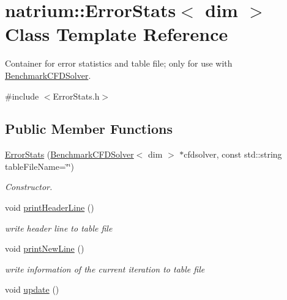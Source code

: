 \hypertarget{classnatrium_1_1ErrorStats}{
\section{natrium::ErrorStats$<$ dim $>$ Class Template Reference}
\label{classnatrium_1_1ErrorStats}
}


Container for error statistics and table file; only for use with \hyperlink{classnatrium_1_1BenchmarkCFDSolver}{BenchmarkCFDSolver}.  


{\ttfamily \#include $<$ErrorStats.h$>$}\subsection*{Public Member Functions}
\begin{DoxyCompactItemize}
\item 
\hyperlink{classnatrium_1_1ErrorStats_a1dcdc9cb0508c7f64a067efae4134754}{ErrorStats} (\hyperlink{classnatrium_1_1BenchmarkCFDSolver}{BenchmarkCFDSolver}$<$ dim $>$ $\ast$cfdsolver, const std::string tableFileName=\char`\"{}\char`\"{})
\begin{DoxyCompactList}\small\item\em Constructor. \item\end{DoxyCompactList}\item 
\hypertarget{classnatrium_1_1ErrorStats_ad8cc77e4ac7a50e030e9a49fe1a5bdba}{
void \hyperlink{classnatrium_1_1ErrorStats_ad8cc77e4ac7a50e030e9a49fe1a5bdba}{printHeaderLine} ()}
\label{classnatrium_1_1ErrorStats_ad8cc77e4ac7a50e030e9a49fe1a5bdba}

\begin{DoxyCompactList}\small\item\em write header line to table file \item\end{DoxyCompactList}\item 
\hypertarget{classnatrium_1_1ErrorStats_af02f31d82efefb482ea4ab3d69642486}{
void \hyperlink{classnatrium_1_1ErrorStats_af02f31d82efefb482ea4ab3d69642486}{printNewLine} ()}
\label{classnatrium_1_1ErrorStats_af02f31d82efefb482ea4ab3d69642486}

\begin{DoxyCompactList}\small\item\em write information of the current iteration to table file \item\end{DoxyCompactList}\item 
\hypertarget{classnatrium_1_1ErrorStats_ad24a8dae524127631e75368a0aac61b5}{
void \hyperlink{classnatrium_1_1ErrorStats_ad24a8dae524127631e75368a0aac61b5}{update} ()}
\label{classnatrium_1_1ErrorStats_ad24a8dae524127631e75368a0aac61b5}


\end{DoxyCompactItemize}
